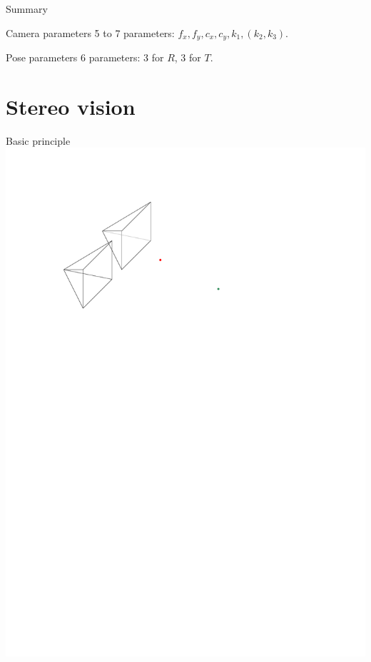 \documentclass{beamer}
\begin{document}
\begin{frame}{Summary}
    \begin{block}{Camera parameters}
        5 to 7 parameters: $f_x, f_y, c_x, c_y, k_1, (k_2, k_3)$.
    \end{block}
    \begin{block}{Pose parameters}
        6 parameters: 3 for $R$, 3 for $T$.
    \end{block}
\end{frame}
\section{Stereo vision}
\begin{frame}
    \tableofcontents[sectionstyle=show/shaded]
\end{frame}
\begin{frame}{Basic principle}
    \includegraphics[width=\textwidth]{images/stereo.pdf}
\end{frame}
\end{document}
